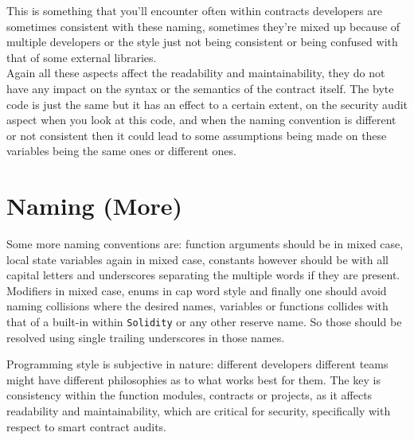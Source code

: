 This is something that you'll encounter often within contracts developers are sometimes consistent with these naming, sometimes they're mixed up because of multiple developers or the style just not being consistent or being confused with that of some external libraries.\\

Again all these aspects affect the readability and maintainability, they do not have any impact on the syntax or the semantics of the contract itself. The byte code is just the same but it has an effect to a certain extent, on the security audit aspect when you look at this code, and when the naming convention is different or not consistent then it could lead to some assumptions being made on these variables being the same ones or different ones.

\section{Naming (More)}
Some more naming conventions are: function arguments should be in mixed case, local state variables again in mixed case, constants however should be with all capital letters and underscores separating the multiple words if they are present.\\ 

Modifiers in mixed case, enums in cap word style and finally one should avoid naming collisions where the desired names, variables or functions collides with that of a built-in within \texttt{Solidity} or any other reserve name. So those should be resolved using single trailing underscores in those names.

Programming style is subjective in nature: different developers different teams might have different philosophies as to what works best for them. The key is consistency within the function modules, contracts or projects, as it affects readability and maintainability, which are critical for security, specifically with respect to smart contract audits.
